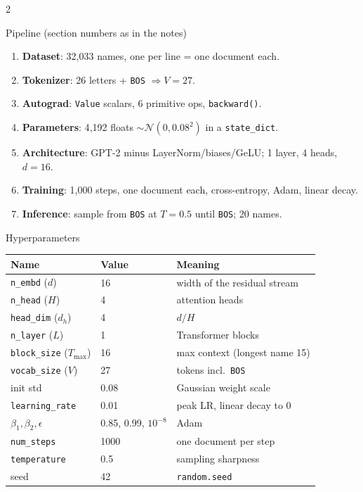 \documentclass[10pt,letterpaper]{article}
\newcommand{\code}[1]{\lstinline[basicstyle=\ttfamily\small]|#1|}
\newcommand{\BOS}{\texttt{BOS}}
\begin{document}
\begin{multicols}{2}
\begin{cs}{Pipeline (section numbers as in the notes)}
\begin{enumerate}
  \item \textbf{Dataset}: 32{,}033 names, one per line = one document each.
  \item \textbf{Tokenizer}: 26 letters + \BOS{} $\Rightarrow V=27$.
  \item \textbf{Autograd}: \code{Value} scalars, 6 primitive ops, \code{backward()}.
  \item \textbf{Parameters}: 4{,}192 floats $\sim\mathcal N(0,0.08^2)$ in a \code{state_dict}.
  \item \textbf{Architecture}: GPT-2 minus LayerNorm/biases/GeLU; 1 layer, 4 heads, $d=16$.
  \item \textbf{Training}: 1{,}000 steps, one document each, cross-entropy, Adam, linear decay.
  \item \textbf{Inference}: sample from \BOS{} at $T=0.5$ until \BOS{}; 20 names.
\end{enumerate}
\end{cs}

\begin{cs}{Hyperparameters}
\begin{tabular}{@{}lll@{}}
\toprule
Name & Value & Meaning \\
\midrule
\code{n_embd} ($d$) & 16 & width of the residual stream \\
\code{n_head} ($H$) & 4 & attention heads \\
\code{head_dim} ($d_h$) & 4 & $d/H$ \\
\code{n_layer} ($L$) & 1 & Transformer blocks \\
\code{block_size} ($T_{\max}$) & 16 & max context (longest name 15) \\
\code{vocab_size} ($V$) & 27 & tokens incl.\ \BOS \\
init std & 0.08 & Gaussian weight scale \\
\code{learning_rate} & 0.01 & peak LR, linear decay to 0 \\
$\beta_1,\beta_2,\epsilon$ & 0.85, 0.99, $10^{-8}$ & Adam \\
\code{num_steps} & 1000 & one document per step \\
\code{temperature} & 0.5 & sampling sharpness \\
seed & 42 & \code{random.seed} \\
\bottomrule
\end{tabular}
\end{cs}


\end{multicols}
\end{document}
